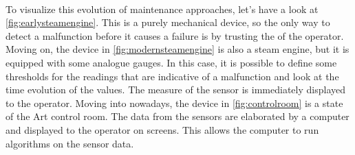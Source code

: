 \paragraph*{}
To visualize this evolution of maintenance approaches, let's have a look at \autoref{fig:earlysteamengine}. This is a purely mechanical device, so the only way to detect a malfunction before it causes a failure is by trusting the  of the operator. Moving on, the device in \autoref{fig:modernsteamengine} is also a steam engine, but it is equipped with some analogue gauges. In this case, it is possible to define some thresholds for the readings that are indicative of a malfunction and look at the time evolution of the values. The measure of the sensor is immediately displayed to the operator. Moving into nowadays, the device in \autoref{fig:controlroom} is a state of the Art control room. The data from the sensors are elaborated by a computer and displayed to the operator on screens. This allows the computer to run algorithms on the sensor data.

